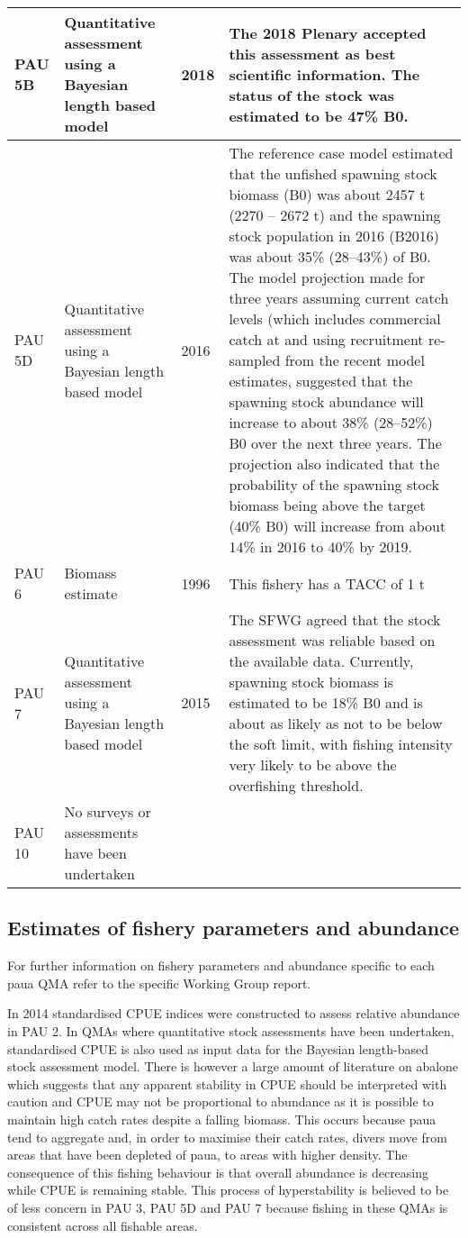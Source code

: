 \documentclass{mpi-plenary}
\theoremstyle{definition}
\theoremstyle{definition}
\theoremstyle{definition}
\theoremstyle{remark}
\begin{document}
\begin{tabular}{l|l|l|l}
\hline
PAU 5B & Quantitative assessment using a Bayesian length based model & 2018 & The 2018 Plenary accepted this assessment as best scientific information.  The status of the stock was estimated to be 47\% B0.\\
\hline
PAU 5D & Quantitative assessment using a Bayesian length based model & 2016 & The reference case model estimated that the unfished spawning stock biomass (B0) was about 2457 t (2270 – 2672 t) and the spawning stock population in 2016 (B2016) was about 35\% (28–43\%) of B0. The model projection made for three years assuming current catch levels (which includes commercial catch at and using recruitment re-sampled from the recent model estimates, suggested that the spawning stock abundance will increase to about 38\% (28–52\%) B0 over the next three years. The projection also indicated that the probability of the spawning stock biomass being above the target (40\% B0) will increase from about 14\% in 2016 to 40\% by 2019.\\
\hline
PAU 6 & Biomass estimate & 1996 & This fishery has a TACC of 1 t\\
\hline
PAU 7 & Quantitative assessment using a Bayesian length based model & 2015 & The SFWG agreed that the stock assessment was reliable based on the available data. Currently, spawning stock biomass is estimated to be 18\% B0 and is about as likely as not to be below the soft limit, with fishing intensity very likely to be above the overfishing threshold.\\
\hline
PAU 10 & No surveys or assessments have been undertaken &  & \\
\hline
\end{tabular}

\subsection{Estimates of fishery parameters and
abundance}\label{estimates-of-fishery-parameters-and-abundance}

For further information on fishery parameters and abundance specific to
each paua QMA refer to the specific Working Group report.

In 2014 standardised CPUE indices were constructed to assess relative
abundance in PAU 2. In QMAs where quantitative stock assessments have
been undertaken, standardised CPUE is also used as input data for the
Bayesian length-based stock assessment model. There is however a large
amount of literature on abalone which suggests that any apparent
stability in CPUE should be interpreted with caution and CPUE may not be
proportional to abundance as it is possible to maintain high catch rates
despite a falling biomass. This occurs because paua tend to aggregate
and, in order to maximise their catch rates, divers move from areas that
have been depleted of paua, to areas with higher density. The
consequence of this fishing behaviour is that overall abundance is
decreasing while CPUE is remaining stable. This process of
hyperstability is believed to be of less concern in PAU 3, PAU 5D and
PAU 7 because fishing in these QMAs is consistent across all fishable
areas.
\end{document}
